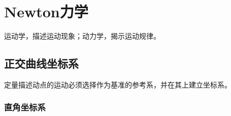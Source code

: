 \chapter{Newton力学}

{\heiti 运动学}，描述运动现象；{\heiti 动力学}，揭示运动规律。

\section{正交曲线坐标系}

定量描述动点的运动必须选择作为基准的参考系，并在其上建立坐标系。

\subsection{直角坐标系}

